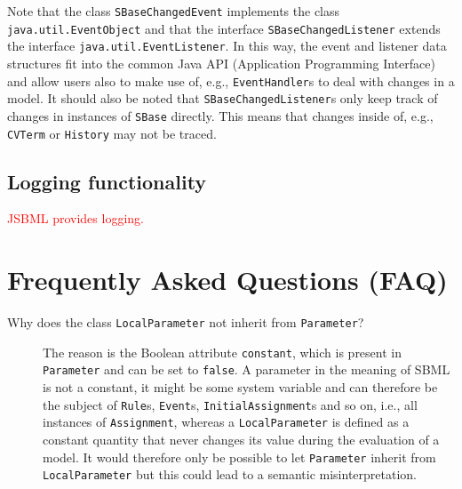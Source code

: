 \documentclass[
  BCOR12mm,
  letterpaper,
  11pt,
  headsepline,
  pointlessnumbers,
  tablecaptionabove,
  onelinecaption,
  headinclude,
  appendixprefix,
  idxtotoc,
  bibtotoc,
  twoside,
  titlepage
]{scrartcl}
\begin{document}
Note that the class \texttt{SBaseChangedEvent} implements the class
\texttt{java.util.EventObject} and that the interface
\texttt{SBaseChangedListener} extends the interface
\texttt{java.util.EventListener}. In this way, the event and listener data
structures fit into the common Java API (Application Programming Interface) and
allow users also to make use of, e.g., \texttt{EventHandler}s to deal with
changes in a model. It should also be noted that \texttt{SBaseChangedListener}s
only keep track of changes in instances of \texttt{SBase} directly. This means
that changes inside of, e.g., \texttt{CVTerm} or \texttt{History} may not be
traced.

\subsection{Logging functionality}

\textcolor{red}{JSBML provides logging.}

\appendix

\section{Frequently Asked Questions (FAQ)}

\begin{description}
  \item[Why does the class \texttt{LocalParameter} not inherit from
  \texttt{Parameter}?]
The reason is the Boolean attribute \texttt{constant}, which is present in
\texttt{Parameter} and can be set to \texttt{false}. A parameter in the meaning
of SBML is not a constant, it might be some system variable and can therefore
be the subject of \texttt{Rule}s,
\texttt{Event}s, \texttt{InitialAssignment}s
and so on, i.e., all instances of \texttt{Assignment}, whereas a
\texttt{LocalParameter} is defined as a constant quantity that never changes its
value during the evaluation of a model. It would therefore only be possible to
let \texttt{Parameter} inherit from \texttt{LocalParameter} but this could lead
to a semantic misinterpretation.
\end{description}
\end{document}
